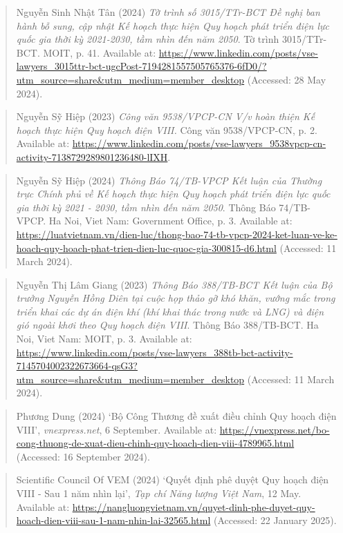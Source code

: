 \documentclass[a4paper,11pt]{report}
\begin{document}
\begin{quote}
Nguyễn Sinh Nhật Tân (2024) \emph{Tờ trình số 3015/TTr-BCT Đề nghị ban hành bỗ sung, cập nhật Kế hoạch thực hiện Quy hoạch phát triển điện lực quốc gia thời kỳ 2021-2030, tầm nhìn đến năm 2050}. Tờ trình 3015/TTr-BCT. MOIT, p. 41. Available at: \url{https://www.linkedin.com/posts/vse-lawyers_3015ttr-bct-ugcPost-7194281557505765376-6fD0/?utm_source=share\&utm_medium=member_desktop} (Accessed: 28 May 2024).
\end{quote}

\begin{quote}
Nguyễn Sỹ Hiệp (2023) \emph{Công văn 9538/VPCP-CN V/v hoàn thiện Kế hoạch thực hiện Quy hoạch điện VIII.} Công văn 9538/VPCP-CN, p. 2. Available at: \url{https://www.linkedin.com/posts/vse-lawyers_9538vpcp-cn-activity-7138729289801236480-lIXH}.
\end{quote}

\begin{quote}
Nguyễn Sỹ Hiệp (2024) \emph{Thông Báo 74/TB-VPCP Kết luận của Thường trực Chính phủ về Kế hoạch thực hiện Quy hoạch phát triển điện lực quốc gia thời kỳ 2021 - 2030, tầm nhìn đến năm 2050}. Thông Báo 74/TB-VPCP. Ha Noi, Viet Nam: Government Office, p. 3. Available at: \url{https://luatvietnam.vn/dien-luc/thong-bao-74-tb-vpcp-2024-ket-luan-ve-ke-hoach-quy-hoach-phat-trien-dien-luc-quoc-gia-300815-d6.html} (Accessed: 11 March 2024).
\end{quote}

\begin{quote}
Nguyễn Thị Lâm Giang (2023) \emph{Thông Báo 388/TB-BCT Kết luận của Bộ trưởng Nguyễn Hồng Diên tại cuộc họp thảo gỡ khó khăn, vướng mắc trong triển khai các dự án điện khí (khí khai thác trong nước và LNG) và điện gió ngoài khơi theo Quy hoạch điện VIII}. Thông Báo 388/TB-BCT. Ha Noi, Viet Nam: MOIT, p. 3. Available at: \url{https://www.linkedin.com/posts/vse-lawyers_388tb-bct-activity-7145704002322673664-qsG3?utm_source=share\&utm_medium=member_desktop} (Accessed: 11 March 2024).
\end{quote}

\begin{quote}
Phương Dung (2024) `Bộ Công Thương đề xuất điều chỉnh Quy hoạch điện VIII', \emph{vnexpress.net}, 6 September. Available at: \url{https://vnexpress.net/bo-cong-thuong-de-xuat-dieu-chinh-quy-hoach-dien-viii-4789965.html} (Accessed: 16 September 2024).
\end{quote}

\begin{quote}
Scientific Council Of VEM (2024) `Quyết định phê duyệt Quy hoạch điện VIII - Sau 1 năm nhìn lại', \emph{Tạp chí Năng lượng Việt Nam}, 12 May. Available at: \url{https://nangluongvietnam.vn/quyet-dinh-phe-duyet-quy-hoach-dien-viii-sau-1-nam-nhin-lai-32565.html} (Accessed: 22 January 2025).
\end{quote}
\end{document}
